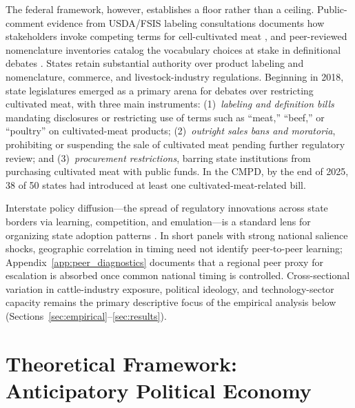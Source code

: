 \documentclass[12pt]{article}
\begin{document}
\begin{table}[htbp]
\begin{threeparttable}
\begin{tablenotes}[flushleft]
\end{tablenotes}
\end{threeparttable}
\end{table}

The federal framework, however, establishes a floor rather than a ceiling.  Public-comment evidence from USDA/FSIS labeling consultations documents how stakeholders invoke competing terms for cell-cultivated meat \citep{failla2023usda}, and peer-reviewed nomenclature inventories catalog the vocabulary choices at stake in definitional debates \citep{malerich2022nomenclature}.  States retain substantial authority over product labeling and nomenclature, commerce, and livestock-industry regulations.  Beginning in 2018, state legislatures emerged as a primary arena for debates over restricting cultivated meat, with three main instruments: (1)~\emph{labeling and definition bills} mandating disclosures or restricting use of terms such as ``meat,'' ``beef,'' or ``poultry'' on cultivated-meat products; (2)~\emph{outright sales bans and moratoria}, prohibiting or suspending the sale of cultivated meat pending further regulatory review; and (3)~\emph{procurement restrictions}, barring state institutions from purchasing cultivated meat with public funds.  In the CMPD, by the end of 2025, 38 of 50 states had introduced at least one cultivated-meat-related bill.

Interstate policy diffusion---the spread of regulatory innovations across state borders via learning, competition, and emulation---is a standard lens for organizing state adoption patterns \citep{walker1969diffusion,berry1992tax,shipan2008mechanisms,volden2008formal,mooney2001regional}.  In short panels with strong national salience shocks, geographic correlation in timing need not identify peer-to-peer learning; Appendix~\ref{app:peer_diagnostics} documents that a regional peer proxy for escalation is absorbed once common national timing is controlled.  Cross-sectional variation in cattle-industry exposure, political ideology, and technology-sector capacity remains the primary descriptive focus of the empirical analysis below (Sections~\ref{sec:empirical}--\ref{sec:results}).

\section{Theoretical Framework: Anticipatory Political Economy}
\label{sec:theory}
\end{document}
